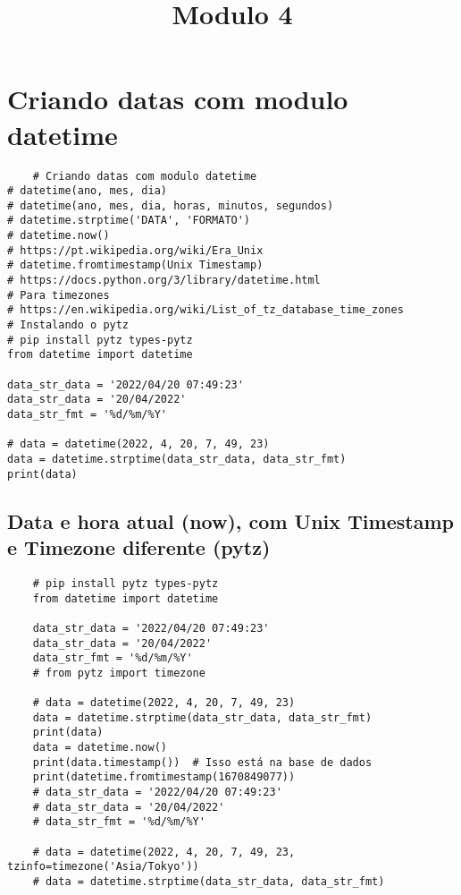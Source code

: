 \documentclass{article}
\date{} %
\title{Modulo 4}
\begin{document}
\maketitle
\tableofcontents
\newpage
\section{ Criando datas com modulo datetime}
\begin{lstlisting}
    # Criando datas com modulo datetime
# datetime(ano, mes, dia)
# datetime(ano, mes, dia, horas, minutos, segundos)
# datetime.strptime('DATA', 'FORMATO')
# datetime.now()
# https://pt.wikipedia.org/wiki/Era_Unix
# datetime.fromtimestamp(Unix Timestamp)
# https://docs.python.org/3/library/datetime.html
# Para timezones
# https://en.wikipedia.org/wiki/List_of_tz_database_time_zones
# Instalando o pytz
# pip install pytz types-pytz
from datetime import datetime

data_str_data = '2022/04/20 07:49:23'
data_str_data = '20/04/2022'
data_str_fmt = '%d/%m/%Y'

# data = datetime(2022, 4, 20, 7, 49, 23)
data = datetime.strptime(data_str_data, data_str_fmt)
print(data)
\end{lstlisting}
\subsection{Data e hora atual (now), com Unix Timestamp e Timezone diferente (pytz)}
\begin{lstlisting}
    # pip install pytz types-pytz
    from datetime import datetime
    
    data_str_data = '2022/04/20 07:49:23'
    data_str_data = '20/04/2022'
    data_str_fmt = '%d/%m/%Y'
    # from pytz import timezone
    
    # data = datetime(2022, 4, 20, 7, 49, 23)
    data = datetime.strptime(data_str_data, data_str_fmt)
    print(data)
    data = datetime.now()
    print(data.timestamp())  # Isso está na base de dados
    print(datetime.fromtimestamp(1670849077))
    # data_str_data = '2022/04/20 07:49:23'
    # data_str_data = '20/04/2022'
    # data_str_fmt = '%d/%m/%Y'
    
    # data = datetime(2022, 4, 20, 7, 49, 23, tzinfo=timezone('Asia/Tokyo'))
    # data = datetime.strptime(data_str_data, data_str_fmt)
\end{lstlisting}
\end{document}

